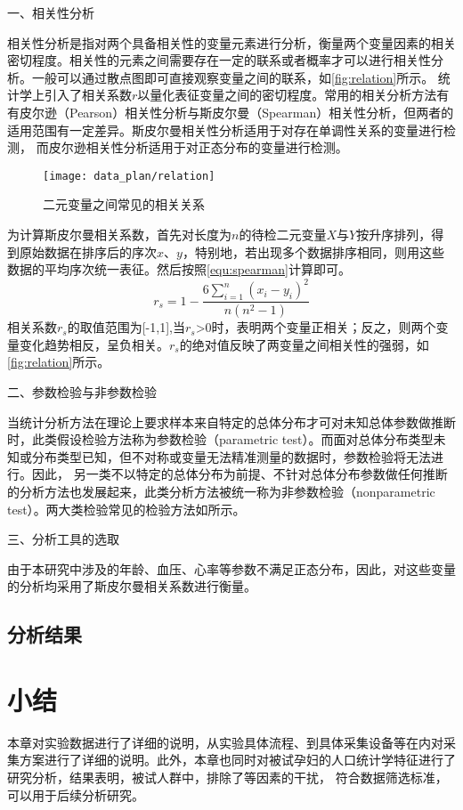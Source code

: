 一、相关性分析

相关性分析是指对两个具备相关性的变量元素进行分析，衡量两个变量因素的相关密切程度\cite{Zhang2019}。相关性的元素之间需要存在一定的联系或者概率才可以进行相关性分析。一般可以通过散点图即可直接观察变量之间的联系，如\autoref{fig:relation}所示。
统计学上引入了相关系数$r$以量化表征变量之间的密切程度。常用的相关分析方法有有皮尔逊（Pearson）相关性分析与斯皮尔曼（Spearman）相关性分析，但两者的适用范围有一定差异。斯皮尔曼相关性分析适用于对存在单调性关系的变量进行检测，
而皮尔逊相关性分析适用于对正态分布的变量进行检测。
\begin{figure}[htbp]
      \centering
      \texttt{[image: data\_plan/relation]}
      \caption{\label{fig:relation}二元变量之间常见的相关关系\cite{IXL2022}}
\end{figure}

为计算斯皮尔曼相关系数，首先对长度为$n$的待检二元变量$X$与$Y$按升序排列，得到原始数据在排序后的序次$x$、$y$，特别地，若出现多个数据排序相同，则用这些数据的平均序次统一表征。然后按照\autoref{equ:spearman}计算即可。
\begin{equation}
      \label{equ:spearman}
      r_{s}=1-\frac{6\sum_{i=1}^{n}(x_{i}-y_{i})^2}{n(n^2-1)}
\end{equation}
相关系数$r_{s}$的取值范围为[-1,1],当$r_{s}$>0时，表明两个变量正相关；反之，则两个变量变化趋势相反，呈负相关。$r_{s}$的绝对值反映了两变量之间相关性的强弱，如\autoref{fig:relation}所示。

二、参数检验与非参数检验

当统计分析方法在理论上要求样本来自特定的总体分布才可对未知总体参数做推断时，此类假设检验方法称为参数检验（parametric test）。而面对总体分布类型未知或分布类型已知，但不对称或变量无法精准测量的数据时，参数检验将无法进行。因此，
另一类不以特定的总体分布为前提、不针对总体分布参数做任何推断的分析方法也发展起来，此类分析方法被统一称为非参数检验（nonparametric test）\cite{Guo2017,Hu2021,Zhang2019}。两大类检验常见的检验方法如所示。

三、分析工具的选取

由于本研究中涉及的年龄、血压、心率等参数不满足正态分布，因此，对这些变量的分析均采用了斯皮尔曼相关系数进行衡量。
\subsection{分析结果}
\section{小结}
本章对实验数据进行了详细的说明，从实验具体流程、到具体采集设备等在内对采集方案进行了详细的说明。此外，本章也同时对被试孕妇的人口统计学特征进行了研究分析，结果表明，被试人群中，排除了等因素的干扰，
符合数据筛选标准，可以用于后续分析研究。  